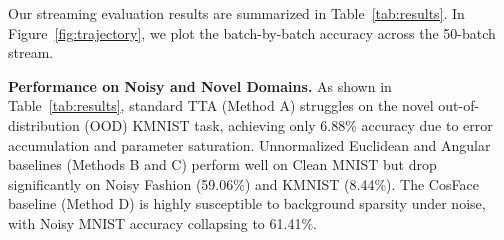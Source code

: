 \documentclass{article}
\theoremstyle{plain}
\theoremstyle{definition}
\theoremstyle{remark}
\begin{document}
Our streaming evaluation results are summarized in Table~\ref{tab:results}. In Figure~\ref{fig:trajectory}, we plot the batch-by-batch accuracy across the 50-batch stream.

\begin{table}[t]
  \caption{Online test accuracies (\%) across different phases of the non-stationary, noisy 50-batch test stream.}
  \label{tab:results}
  \vskip 0.15in
  \begin{center}
    \begin{small}
    \end{small}
  \end{center}
  \vskip -0.1in
\end{table}

\textbf{Performance on Noisy and Novel Domains.}
As shown in Table~\ref{tab:results}, standard TTA (Method A) struggles on the novel out-of-distribution (OOD) KMNIST task, achieving only 6.88\% accuracy due to error accumulation and parameter saturation. Unnormalized Euclidean and Angular baselines (Methods B and C) perform well on Clean MNIST but drop significantly on Noisy Fashion (59.06\%) and KMNIST (8.44\%). The CosFace baseline (Method D) is highly susceptible to background sparsity under noise, with Noisy MNIST accuracy collapsing to 61.41\%.
\end{document}
